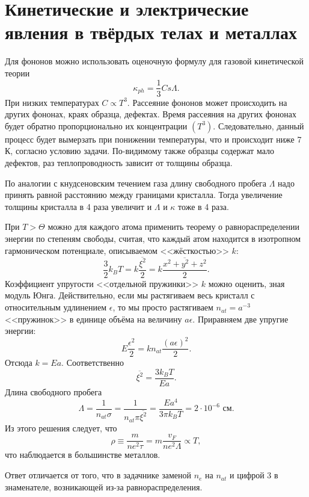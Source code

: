 \documentclass[a4paper]{article}
\begin{document}
\section{Кинетические и электрические явления
в твёрдых телах и металлах}
\begin{hiProb}[2.65]
\end{hiProb}
\begin{sol}
Для фононов можно использовать оценочную формулу
для газовой кинетической теории 
\[
\kappa_{ph}= \frac{1}{3} C s\Lambda
.\] 
При низких температурах $C \propto T^3$.
Рассеяние фононов может происходить на других
фононах, краях образца, дефектах. Время
рассеяния на других фононах будет обратно
пропорционально их концентрации $(T^3)$. Следовательно,
данный процесс будет вымерзать при понижении температуры, что и происходит ниже 7 К, согласно условию
задачи. По-видимому также образцы содержат мало
дефектов, раз теплопроводность зависит от толщины
образца.

По аналогии с кнудсеновским течением газа длину
свободного пробега  $\Lambda$ надо принять
равной расстоянию между границами кристалла. Тогда
увеличение толщины кристалла в 4 раза увеличит
и $ \Lambda$ и $\kappa$ тоже в 4 раза.
\end{sol}
\begin{hiProb}[3.77]
\end{hiProb}
\begin{sol}
При $T > \Theta$ можно для каждого атома
применить теорему о равнораспределении энергии
по степеням свободы, считая, что каждый атом находится
в изотропном гармоническом потенциале, описываемом
<<жёсткостью>> $k$:
\[
\frac{3}{2} k_B T= k \frac{\overline{\xi^2}}{2}=
k \frac{\overline{x^2 +y^2+z^2}}{2}
.\] 
Коэффициент упругости <<отдельной пружинки>>
$k$ можно оценить, зная модуль Юнга. Действительно,
если мы растягиваем весь кристалл с относительным
удлинением $\epsilon $, то мы  просто растягиваем
$n_{at}=a^{-3}$ <<пружинок>> в единице объёма
на величину $a\epsilon $. Приравняем две
упругие энергии:
\[
	E \frac{\epsilon ^2}{2}=k n_{at} \frac{(a\epsilon )^2}{2}
.\] 
Отсюда $k=Ea$. Соответственно 
\[
\overline{\xi^2}= \frac{3k_B T}{Ea}
.\] 
Длина свободного пробега
\[
\Lambda = \frac{1}{n_{at}\sigma}= \frac{1}{n_{at}\pi
\overline{\xi^2}}= \frac{Ea^4}{3\pi k_B T}= 2\cdot 
10^{-6} \text{ см}
.\] 
Из этого решения следует, что
 \[
\rho\equiv \frac{m}{ne^2 \tau}=m \frac{v_F}{ne^2 \Lambda} \propto T
,\]
что наблюдается в большинстве металлов.

Ответ отличается от того, что в задачнике заменой
$n_e$ на $n_{at}$ и цифрой 3 в знаменателе,
возникающей из-за равнораспределения.
\end{sol}
\end{document}
